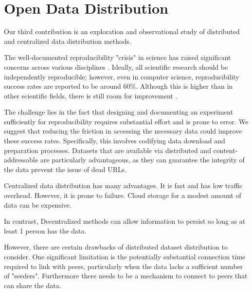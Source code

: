 \documentclass[10pt,twocolumn,letterpaper]{article}
\begin{document}


\section{Open Data Distribution}


Our third contribution is an exploration and observational study of distributed
and centralized data distribution methods. 


The well-documented reproducibility "crisis" in science has raised significant
concerns across various disciplines \cite{baker_reproducibility_2016}. Ideally,
all scientific research should be independently reproducible; however, even in
computer science, reproducibility success rates are reported to be around 60\%.
Although this is higher than in other scientific fields, there is still room
for improvement \cite{NEURIPS2019_c429429b, collberg2016repeatability,
desai_what_2024}.

The challenge lies in the fact that designing and documenting an experiment
sufficiently for reproducibility requires substantial effort and is prone to
error. We suggest that reducing the friction in accessing the necessary data
could improve these success rates. Specifically, this involves codifying data
download and preparation processes. Datasets that are available via distributed
and content-addressable are particularly advantageous, as they can guarantee
the integrity of the data prevent the issue of dead URLs.

Centralized data distribution has many advantages. It is fast and has low
traffic overhead. However, it is prone to failure.  
Cloud storage for a modest amount of data can be expensive.

In contrast, Decentralized methods can allow information to persist so long as
at least 1 person has the data.

However, there are certain drawbacks of distributed dataset distribution to
consider. One significant limitation is the potentially substantial connection
time required to link with peers, particularly when the data lacks a sufficient
number of "seeders". Furthermore there needs to be a mechanism to connect to
peers that can share the data.
\end{document}

